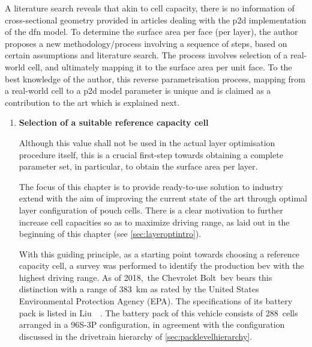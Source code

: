 A literature search reveals that akin  to cell capacity, there is no information
of  cross-sectional geometry  provided in  articles dealing  with the  \gls{p2d}
implementation of  the \gls{dfn} model. To  determine the surface area  per face
(per layer), the author proposes  a new methodology/process involving a sequence
of  steps, based  on  certain  assumptions and  literature  search. The  process
involves  selection of  a  real-world cell,  and ultimately  mapping  it to  the
surface area per  unit face. To the  best knowledge of the  author, this reverse
parametrisation process,  mapping from  a real-world cell  to a  \gls{p2d} model
parameter  is unique  and is  claimed  as a  contribution  to the  art which  is
explained next.

\begin{enumerate}[
    leftmargin=0pt, itemindent=20pt,
    labelwidth=15pt, labelsep=5pt, listparindent=0.7cm,
    align=left]
\item \hypertarget{refcellselection}{\textbf{Selection of a suitable reference capacity cell}}

    Although  this value  shall not  be used  in the  actual layer  optimisation
    procedure itself, this is a  crucial first-step towards obtaining a complete
    parameter set, in particular, to obtain the surface area per layer.

    The focus  of this chapter is  to provide ready-to-use solution  to industry
    extend  with the  aim of  improving  the current  state of  the art  through
    optimal layer configuration  of pouch cells. There is a  clear motivation to
    further increase  cell capacities so as  to maximize driving range,  as laid
    out in the beginning of this chapter (see \cref{sec:layeroptintro}).

    With  this  guiding  principle,  as  a starting  point  towards  choosing  a
    reference capacity cell,  a survey was performed to  identify the production
    \gls{bev}  with  the  highest  driving  range.  As  of  2018,~the  Chevrolet
    Bolt~\gls{bev} bears this distinction  with a range of \SI{383}{\kilo\meter}
    as rated  by the  United States Environmental  Protection Agency  (EPA). The
    specifications of  its battery pack is  listed in Liu~\etal~\cite{Liu2016a}.
    The  battery pack  of  this  vehicle consists  of  288~cells  arranged in  a
    96S-3P configuration, in  agreement with the configuration  discussed in the
    drivetrain  hierarchy  of  \cref{sec:packlevelhierarchy}.


\end{enumerate}
